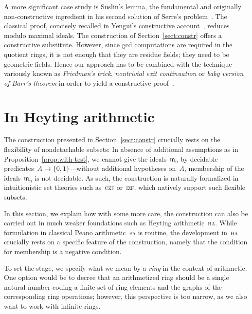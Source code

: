 \documentclass[envcountsect,envcountsame,runningheads]{llncs}
\newcommand{\mmm}{\mathfrak{m}}
\renewcommand{\_}{\mathpunct{.}\,}
\begin{document}
\begin{remark}\label{rem:suslin}
A more significant case study is Suslin's lemma, the fundamental and originally
non-constructive ingredient in his second solution of Serre's
problem~\cite{suslin:structure}. The classical proof, concisely recalled in
Yengui's constructive account~\cite{yengui:maximal}, reduces modulo
maximal ideals. The construction of Section~\ref{sect:constr} offers a
constructive substitute. However, since gcd computations
are required in the quotient rings, it is not enough that they are residue
fields; they need to be geometric fields. Hence our approach has to be combined
with the technique variously known as \emph{Friedman's trick}, \emph{nontrivial
exit continuation} or \emph{baby version of Barr's theorem} in order to yield a
constructive
proof~\cite{friedman:trick,murthy:classical-proofs,barr:without-points,blechschmidt:generalized-spaces}.
\end{remark}


\section{In Heyting arithmetic}
\label{sect:arithmetization}

The construction presented in Section~\ref{sect:constr} crucially rests on the
flexibility of nondetachable subsets: In absence of additional
assumptions as in Proposition~\ref{prop:with-test},
we cannot give the ideals~$\mmm_n$ by decidable
predicates~$A \to \{0,1\}$---without additional hypotheses on~$A$, membership of the
ideals~$\mmm_n$ is not decidable. As such, the construction is
naturally formalized in intuitionistic set theories such as~\textsc{czf}
or~\textsc{izf}, which natively support such flexible subsets.

In this section, we explain how with some more care, the construction can also
be carried out in much weaker foundations such as Heyting
arithmetic~\textsc{ha}. While formulation in classical Peano arithmetic~\textsc{pa}
is routine, the development in~\textsc{ha} crucially rests on a specific
feature of the construction, namely that the condition for membership is a
negative condition.

To set the stage, we specify what we mean by a \emph{ring} in the context of
arithmetic. One option would be to decree that an arithmetized ring should be a single
natural number coding a finite set of ring elements and the graphs of the
corresponding ring operations; however, this perspective is too narrow, as we
also want to work with infinite rings.
\end{document}
